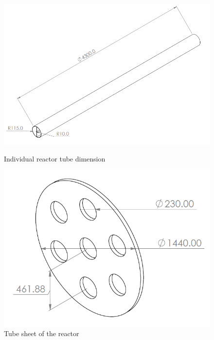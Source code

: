 \begin{figure}[h]
    \begin{minipage}[t]{0.49\linewidth}
    \includegraphics[width=\linewidth]{chapters/2-reaction/figures/FYD solo tube with calc.PNG}
    \caption{Individual reactor tube dimension}
    \label{fig:soloreactorrube}
    \end{minipage}\hfill
    \begin{minipage}[t]{0.49\linewidth}
        \includegraphics[width=\linewidth]{chapters/2-reaction/figures/FYD tube sheet with calc.PNG}
        \caption{Tube sheet of the reactor}
        \label{fig:tubesheet} 
    \end{minipage}
\end{figure}